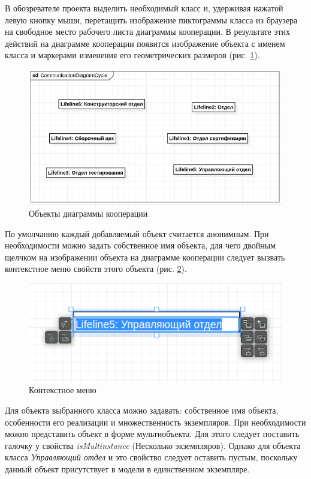 \documentclass[a4paper,12pt]{report}
\begin{document}
В обозревателе проекта выделить необходимый класс и, удерживая нажатой левую кнопку мыши, перетащить изображение пиктограммы класса из браузера на свободное место рабочего листа диаграммы кооперации. В результате этих действий на диаграмме кооперации появится изображение объекта с именем класса и маркерами изменения его геометрических размеров (рис. \ref{fig:communicationfield}).

\begin{figure}[h!]
	\centering
	\includegraphics[width=0.8\linewidth]{images/communicationfield}
	\caption{Объекты диаграммы кооперации}
	\label{fig:communicationfield}
\end{figure}


По умолчанию каждый добавляемый объект считается анонимным. При необходимости можно задать собственное имя объекта, для чего двойным щелчком на изображении объекта на диаграмме кооперации следует вызвать контекстное меню свойств этого объекта (рис. \ref{fig:communicationobject}).

\begin{figure}[h!]
	\centering
	\includegraphics[width=0.7\linewidth]{images/communicationobject}
	\caption{Контекстное меню}
	\label{fig:communicationobject}
\end{figure}


Для объекта выбранного класса можно задавать: собственное имя объекта, особенности его реализации и множественность экземпляров.
\label{multinstance}
При необходимости можно представить объект в форме мультиобъекта. Для этого следует поставить галочку у свойства \textit{isMultinstance } (Несколько экземпляров). Однако для объекта класса \textit{Управляющий отдел} и это свойство следует оставить пустым, поскольку данный объект присутствует в модели в единственном экземпляре.
\end{document}
